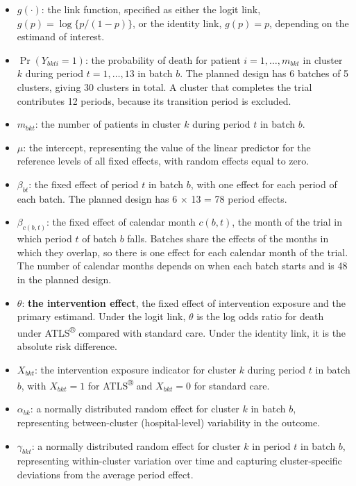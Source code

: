 \documentclass[
]{scrartcl}
\providecommand{\tightlist}{%
  \setlength{\itemsep}{0pt}\setlength{\parskip}{0pt}}\usepackage{longtable,booktabs,array}
\begin{document}
\begin{itemize}
\tightlist
\item
  \(g(\cdot)\): the link function, specified as either the logit link,
  \(g(p) = \log\{p/(1-p)\}\), or the identity link, \(g(p) = p\),
  depending on the estimand of interest.
\item
  \(\Pr(Y_{bkti} = 1)\): the probability of death for patient
  \(i = 1, \dotsc, m_{bkt}\) in cluster \(k\) during period
  \(t = 1, \dotsc, 13\) in batch \(b\). The planned design has 6 batches
  of 5 clusters, giving 30 clusters in total. A cluster that completes
  the trial contributes 12 periods, because its transition period is
  excluded.
\item
  \(m_{bkt}\): the number of patients in cluster \(k\) during period
  \(t\) in batch \(b\).
\item
  \(\mu\): the intercept, representing the value of the linear predictor
  for the reference levels of all fixed effects, with random effects
  equal to zero.
\item
  \(\beta_{bt}\): the fixed effect of period \(t\) in batch \(b\), with
  one effect for each period of each batch. The planned design has 6
  \(\times\) 13 = 78 period effects.
\item
  \(\beta_{c(b,t)}\): the fixed effect of calendar month \(c(b,t)\), the
  month of the trial in which period \(t\) of batch \(b\) falls. Batches
  share the effects of the months in which they overlap, so there is one
  effect for each calendar month of the trial. The number of calendar
  months depends on when each batch starts and is 48 in the planned
  design.
\item
  \(\theta\): \textbf{the intervention effect}, the fixed effect of
  intervention exposure and the primary estimand. Under the logit link,
  \(\theta\) is the log odds ratio for death under
  ATLS\textsuperscript{®} compared with standard care. Under the
  identity link, it is the absolute risk difference.
\item
  \(X_{bkt}\): the intervention exposure indicator for cluster \(k\)
  during period \(t\) in batch \(b\), with \(X_{bkt} = 1\) for
  ATLS\textsuperscript{®} and \(X_{bkt} = 0\) for standard care.
\item
  \(\alpha_{bk}\): a normally distributed random effect for cluster
  \(k\) in batch \(b\), representing between-cluster (hospital-level)
  variability in the outcome.
\item
  \(\gamma_{bkt}\): a normally distributed random effect for cluster
  \(k\) in period \(t\) in batch \(b\), representing within-cluster
  variation over time and capturing cluster-specific deviations from the
  average period effect.
\end{itemize}
\end{document}
